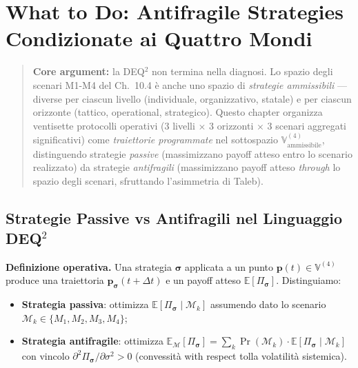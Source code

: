 \chapter{What to Do: Antifragile Strategies Condizionate ai Quattro
Mondi}\label{cosa-fare-strategie-antifragili-condizionate-ai-quattro-mondi}

\begin{quote}
\textbf{Core argument:} la DEQ$^2$ non termina nella diagnosi. Lo
spazio degli scenari M1-M4 del Ch.~10.4 è anche uno spazio di
\emph{strategie ammissibili} --- diverse per ciascun livello
(individuale, organizzativo, statale) e per ciascun orizzonte (tattico,
operational, strategico). Questo chapter organizza ventisette protocolli
operativi (3 livelli $\times$ 3 orizzonti $\times$ 3 scenari aggregati significativi)
come \emph{traiettorie programmate} nel sottospazio
\(\mathbb{V}^{(4)}_{\text{ammissibile}}\), distinguendo strategie
\emph{passive} (massimizzano payoff atteso entro lo scenario realizzato)
da strategie \emph{antifragili} (massimizzano payoff atteso
\emph{through} lo spazio degli scenari, sfruttando l'asimmetria di
Taleb).
\end{quote}



\section{Strategie Passive vs Antifragili nel Linguaggio
DEQ$^2$}\label{strategie-passive-vs-antifragili-nel-linguaggio-dequxb2}

\Hypoth{} \textbf{Definizione operativa.} Una strategia
\(\boldsymbol{\sigma}\) applicata a un punto
\(\boldsymbol{p}(t) \in \mathbb{V}^{(4)}\) produce una traiettoria
\(\boldsymbol{p}_{\boldsymbol{\sigma}}(t+\Delta t)\) e un payoff atteso
\(\mathbb{E}[\Pi_{\boldsymbol{\sigma}}]\). Distinguiamo:

\begin{itemize}
\tightlist
\item
  \textbf{Strategia passiva}: ottimizza
  \(\mathbb{E}[\Pi_{\boldsymbol{\sigma}} \mid \mathcal{M}_k]\) assumendo
  dato lo scenario \(\mathcal{M}_k \in \{M_1, M_2, M_3, M_4\}\);
\item
  \textbf{Strategia antifragile}: ottimizza
  \(\mathbb{E}_{\mathcal{M}}[\Pi_{\boldsymbol{\sigma}}] = \sum_k \Pr(\mathcal{M}_k) \cdot \mathbb{E}[\Pi_{\boldsymbol{\sigma}} \mid \mathcal{M}_k]\)
  con vincolo
  \(\partial^2 \Pi_{\boldsymbol{\sigma}} / \partial \sigma^2 > 0\)
  (convessità with respect tolla volatilità sistemica).
\end{itemize}

